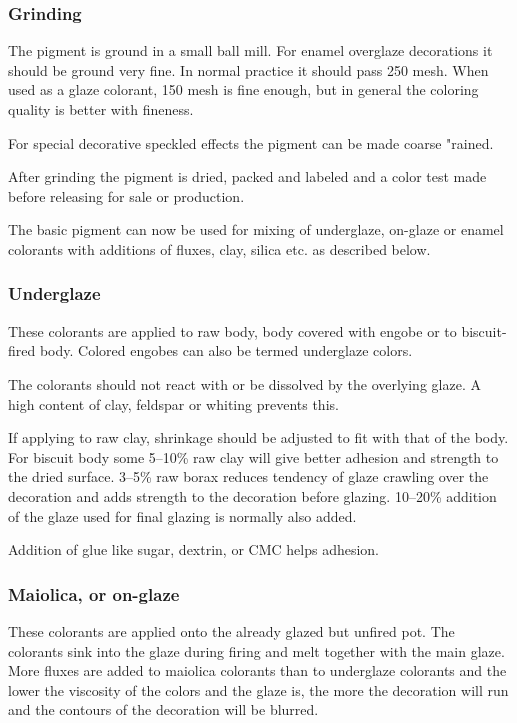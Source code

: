 \subsubsection{Grinding}
The pigment is ground in a small ball mill. For enamel overglaze decorations it 
should be ground very fine. In normal practice it should pass 250 mesh. When 
used as a glaze colorant, 150 mesh is fine enough, but in general the coloring 
quality is better with fineness.

For special decorative speckled effects the pigment can be made coarse "rained.

After grinding the pigment is dried, packed and labeled and a color test made 
before releasing for sale or production.

The basic pigment can now be used for mixing of underglaze, on-glaze or enamel 
colorants with additions of fluxes, clay, silica etc. as described below.
\subsubsection{Underglaze}
These colorants are applied to raw body, body covered with engobe or to 
biscuit-fired body. Colored engobes can also be termed underglaze colors.

The colorants should not react with or be dissolved by the overlying glaze. A 
high content of clay, feldspar or whiting prevents this.

If applying to raw clay, shrinkage should be adjusted to fit with that of the 
body. For biscuit body some 5--10\% raw clay will give better adhesion and 
strength to the dried surface. 3--5\% raw borax reduces tendency of glaze 
crawling over the decoration and adds strength to the decoration before 
glazing. 10--20\% addition of the glaze used for final glazing is normally also 
added.

Addition of glue like sugar, dextrin, or CMC helps adhesion.
\subsubsection{Maiolica, or on-glaze}
These colorants are applied onto the already glazed but unfired pot. The 
colorants sink into the glaze during firing and melt together with the main 
glaze. More fluxes are added to maiolica colorants than to underglaze colorants 
and the lower the viscosity of the colors and the glaze is, the more the 
decoration will run and the contours of the decoration will be blurred.

